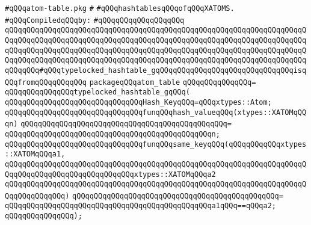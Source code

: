 \label{src/lib/x-kit/xclient/src/iccc/atom-table.pkg}
\verb|#qQQqatom-table.pkg|\newline
\verb|#|\newline
\verb|#qQQqhashtablesqQQqofqQQqXATOMS.|\newline
\newline
\verb|#qQQqCompiledqQQqby:|\newline
\verb|#qQQqqQQqqQQqqQQqqQQq|\newline
\newline
\newline
\verb|qQQqqQQqqQQqqQQqqQQqqQQqqQQqqQQqqQQqqQQqqQQqqQQqqQQqqQQqqQQqqQQqqQQqqQQqqQQqqQQqqQQqqQQqqQQqqQQqqQQqqQQqqQQqqQQqqQQqqQQqqQQqqQQqqQQqqQQqqQQqqQQqqQQqqQQqqQQqqQQqqQQqqQQqqQQqqQQqqQQqqQQqqQQqqQQqqQQqqQQqqQQqqQQqqQQqqQQqqQQqqQQqqQQqqQQqqQQqqQQqqQQqqQQqqQQqqQQqqQQqqQQqqQQqqQQqqQQqqQQqqQQqqQQq#qQQqtypelocked_hashtable_gqQQqqQQqqQQqqQQqqQQqqQQqqQQqqQQqisqQQqfromqQQqqQQqqQQq|\newline
\verb|packageqQQqatom_table|\newline
\verb|qQQqqQQqqQQqqQQq=|\newline
\verb|qQQqqQQqqQQqqQQqtypelocked_hashtable_gqQQq(|\newline
\newline
\verb|qQQqqQQqqQQqqQQqqQQqqQQqqQQqqQQqHash_KeyqQQq=qQQqxtypes::Atom;|\newline
\newline
\verb|qQQqqQQqqQQqqQQqqQQqqQQqqQQqqQQqfunqQQqhash_valueqQQq(xtypes::XATOMqQQqn)|\newline
\verb|qQQqqQQqqQQqqQQqqQQqqQQqqQQqqQQqqQQqqQQqqQQqqQQq=|\newline
\verb|qQQqqQQqqQQqqQQqqQQqqQQqqQQqqQQqqQQqqQQqqQQqqQQqn;|\newline
\newline
\verb|qQQqqQQqqQQqqQQqqQQqqQQqqQQqqQQqfunqQQqsame_keyqQQq(qQQqqQQqqQQqxtypes::XATOMqQQqa1,|\newline
\verb|qQQqqQQqqQQqqQQqqQQqqQQqqQQqqQQqqQQqqQQqqQQqqQQqqQQqqQQqqQQqqQQqqQQqqQQqqQQqqQQqqQQqqQQqqQQqqQQqqQQqxtypes::XATOMqQQqa2|\newline
\verb|qQQqqQQqqQQqqQQqqQQqqQQqqQQqqQQqqQQqqQQqqQQqqQQqqQQqqQQqqQQqqQQqqQQqqQQqqQQqqQQqqQQq)|\newline
\verb|qQQqqQQqqQQqqQQqqQQqqQQqqQQqqQQqqQQqqQQqqQQqqQQq=|\newline
\verb|qQQqqQQqqQQqqQQqqQQqqQQqqQQqqQQqqQQqqQQqqQQqqQQqa1qQQq==qQQqa2;|\newline
\verb|qQQqqQQqqQQqqQQq);|\newline
\newline

